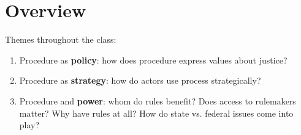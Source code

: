 \section{Overview}

Themes throughout the class:

\begin{enumerate}
    \item Procedure as \textbf{policy}: how does procedure express values 
    about justice?
    \item Procedure as \textbf{strategy}: how do actors use process 
    strategically?
    \item Procedure and \textbf{power}: whom do rules benefit? Does access to 
    rulemakers matter? Why have rules at all? How do state vs. federal issues 
    come into play?
\end{enumerate}
